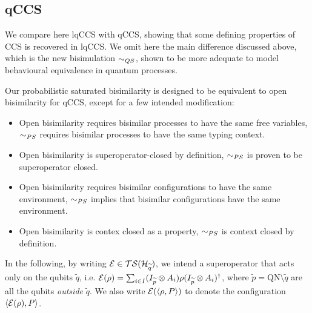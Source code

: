 \subsection{qCCS}
We compare here lqCCS with qCCS, showing that some defining properties of CCS is recovered in lqCCS. We omit here the main difference discussed above, which is the new bisimulation $\sim_{QS}$, shown to be more adequate to model behavioural equivalence in quantum processes.

Our probabilistic saturated bisimilarity is designed to be equivalent to open bisimilarity for qCCS, except for a few intended modification:\begin{itemize}
\item Open bisimilarity requires bisimilar processes to have the same free variables, $\sim_{PS}$ requires bisimilar processes to have the same typing context.
\item Open bisimilarity is superoperator-closed by definition, $\sim_{PS}$ is proven to be superoperator closed.
\item Open bisimilarity requires bisimilar configurations to have the same environment, $\sim_{PS}$ implies that bisimilar configurations have the same environment.
\item Open bisimilarity is contex closed as a property, $\sim_{PS}$ is context closed by definition.
\end{itemize}


In the following, by writing $\mathcal{E} \in \mathcal{TS}(\mathcal{H}_{\widetilde{q}})$, we intend a superoperator that acts only on the qubits $\widetilde{q}$, i.e. $\mathcal{E}(\rho) = \sum_{i \in I} (I_{\widetilde{p}} \otimes A_i) \rho (I_{\widetilde{p}} \otimes A_i)^{\dagger}$, where $\widetilde{p} = \text{QN} \setminus \widetilde{q}$ are all the qubits \textit{outside} $\widetilde{q}$. We also write $\mathcal{E}(\langle\rho, P\rangle)$ to denote the configuration $\langle\mathcal{E}(\rho), P\rangle$.

